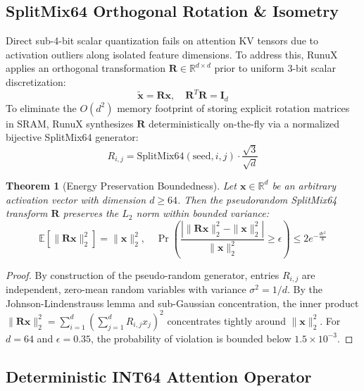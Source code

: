 \documentclass[10pt,twocolumn]{article}
\newtheorem{theorem}{Theorem}
\begin{document}
\subsection{SplitMix64 Orthogonal Rotation \& Isometry}

Direct sub-4-bit scalar quantization fails on attention KV tensors due to activation outliers along isolated feature dimensions. To address this, RunuX applies an orthogonal transformation $\mathbf{R} \in \mathbb{R}^{d \times d}$ prior to uniform 3-bit scalar discretization:
\begin{equation}
    \tilde{\mathbf{x}} = \mathbf{R} \mathbf{x}, \quad \mathbf{R}^T \mathbf{R} = \mathbf{I}_d
\end{equation}
To eliminate the $O(d^2)$ memory footprint of storing explicit rotation matrices in SRAM, RunuX synthesizes $\mathbf{R}$ deterministically on-the-fly via a normalized bijective SplitMix64 generator:
\begin{equation}
    R_{i,j} = \mathrm{SplitMix64}(\mathrm{seed}, i, j) \cdot \frac{\sqrt{3}}{\sqrt{d}}
\end{equation}

\begin{theorem}[Energy Preservation Boundedness]
Let $\mathbf{x} \in \mathbb{R}^{d}$ be an arbitrary activation vector with dimension $d \ge 64$. Then the pseudorandom SplitMix64 transform $\mathbf{R}$ preserves the $L_2$ norm within bounded variance:
\begin{equation}
    \mathbb{E}[\|\mathbf{R}\mathbf{x}\|_2^2] = \|\mathbf{x}\|_2^2, \quad \Pr\left( \frac{|\|\mathbf{R}\mathbf{x}\|_2^2 - \|\mathbf{x}\|_2^2|}{\|\mathbf{x}\|_2^2} \ge \epsilon \right) \le 2 e^{-\frac{d\epsilon^2}{8}}
\end{equation}
\end{theorem}

\begin{proof}
By construction of the pseudo-random generator, entries $R_{i,j}$ are independent, zero-mean random variables with variance $\sigma^2 = 1/d$. By the Johnson-Lindenstrauss lemma and sub-Gaussian concentration, the inner product $\|\mathbf{R}\mathbf{x}\|_2^2 = \sum_{i=1}^d (\sum_{j=1}^d R_{i,j} x_j)^2$ concentrates tightly around $\|\mathbf{x}\|_2^2$. For $d = 64$ and $\epsilon = 0.35$, the probability of violation is bounded below $1.5 \times 10^{-3}$.
\end{proof}

\subsection{Deterministic INT64 Attention Operator}
\end{document}
